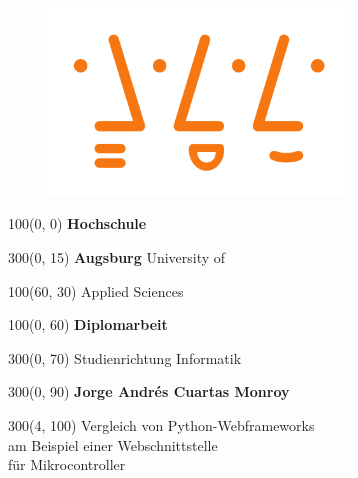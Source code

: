 \begin{titlepage}
\begin{figure}[htb]
\centering
\includegraphics[width=8cm]{images/hsaugsburglogo.png}
\label{Logo}
\end{figure}

\setlength{\TPHorizModule}{1mm}
\setlength{\TPVertModule}{1mm}


\begin{textblock}{100}(0, 0)
\fontsize{60}{15}
\selectfont
\textbf{Hochschule} 
\end{textblock}

\begin{textblock}{300}(0, 15)
\fontsize{50}{15}
\selectfont
\textbf{Augsburg} University of 
\end{textblock}

\begin{textblock}{100}(60, 30)
\fontsize{50}{15}
\selectfont
Applied Sciences 
\end{textblock}

\begin{textblock}{100}(0, 60)
\fontsize{30}{15}
\selectfont 
\textbf{Diplomarbeit} 
\end{textblock}

\begin{textblock}{300}(0, 70)
\fontsize{20}{15}
\selectfont 
Studienrichtung Informatik 
\end{textblock}

\begin{textblock}{300}(0, 90)
\fontsize{20}{15}
\selectfont 
\textbf{Jorge Andrés Cuartas Monroy}
\end{textblock}

\begin{textblock}{300}(4, 100)
\fontsize{20}{20}
\selectfont 
\parindent0mm
Vergleich von Python-Webframeworks\\
am Beispiel einer Webschnittstelle\\
für Mikrocontroller
\end{textblock}


\end{titlepage}
